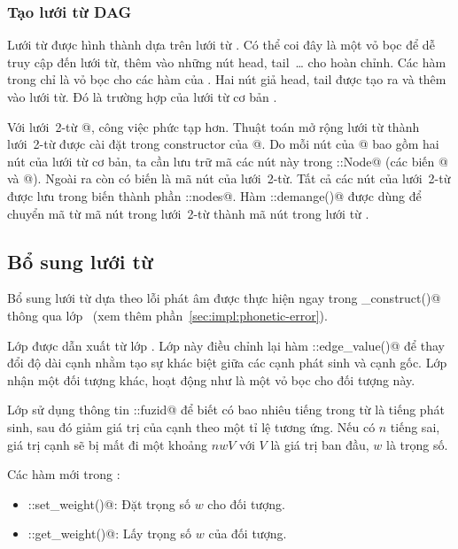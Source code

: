 \documentclass[a4paper,oneside,14pt]{extbook} %
\begin{document}
\subsubsection{Tạo lưới từ DAG}

Lưới từ \verb@DAG@ được hình thành dựa trên lưới từ \verb@Lattice@. Có
thể coi đây là một vỏ bọc để dễ truy cập đến lưới từ, thêm vào những
nút head, tail~\ldots{} cho hoàn chỉnh. Các hàm trong \verb@DAG@ chỉ
là vỏ bọc cho các hàm của \verb@Lattice@. Hai nút giả head, tail được
tạo ra và thêm vào lưới từ. Đó là trường hợp của lưới từ cơ bản
\verb@WordDAG@. 

Với lưới~2-từ @, công việc phức tạp hơn. Thuật toán mở
rộng lưới từ thành lưới~2-từ được cài đặt trong constructor của
@.  Do mỗi nút của @ bao gồm hai nút của
lưới từ cơ bản, ta cần lưu trữ mã các nút này trong
::Node@ (các biến @ và @). Ngoài ra còn
có biến \verb@id@ là mã nút của lưới~2-từ. Tất cả các nút của
lưới~2-từ được lưu trong biến thành phần ::nodes@. Hàm
::demange()@ được dùng để chuyển mã từ mã nút trong
lưới~2-từ thành mã nút trong lưới từ \verb@WordDAG@.



\subsection{Bổ sung lưới từ}

Bổ sung lưới từ dựa theo lỗi phát âm được thực hiện ngay trong
\verb@pre_construct()@ thông qua lớp \verb@FuzzyWordState@~(xem thêm
phần~\ref{sec:impl:phonetic-error}).


Lớp \verb@PenaltyDAG@ được dẫn xuất từ lớp \verb@DAG@. Lớp này điều
chỉnh lại hàm \verb@DAG::edge_value()@ để thay đổi độ dài cạnh nhằm
tạo sự khác biệt giữa các cạnh phát sinh và cạnh gốc. Lớp nhận một đối
tượng \verb@DAG@ khác, hoạt động như là một vỏ bọc cho đối tượng này.

Lớp sử dụng thông tin \verb@WordEntry::fuzid@ để biết có bao nhiêu
tiếng trong từ là tiếng phát sinh, sau đó giảm giá trị của cạnh theo
một tỉ lệ tương ứng. Nếu có $n$ tiếng sai, giá trị cạnh sẽ bị mất đi
một khoảng $nwV$
với $V$ là giá trị ban đầu, $w$ là trọng số.

Các hàm mới trong \verb@PenaltyDAG@:
\begin{itemize}
\item \verb@PenaltyDAG::set_weight()@: Đặt trọng số $w$ cho đối tượng.
\item \verb@PenaltyDAG::get_weight()@: Lấy trọng số $w$ của đối tượng.
\end{itemize}
\end{document}
